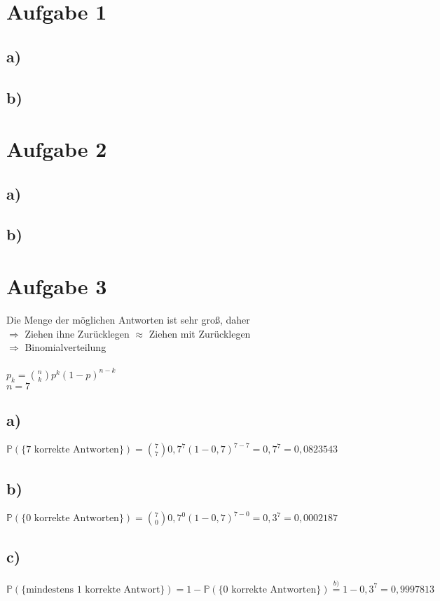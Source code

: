 \documentclass{scrartcl}
\begin{document}
\section*{Aufgabe 1}
  \subsection*{a)}

  \subsection*{b)}


\section*{Aufgabe 2}
  \subsection*{a)}

  \subsection*{b)}


\section*{Aufgabe 3}
	Die Menge der möglichen Antworten ist sehr groß, daher \\
	$\Rightarrow$ Ziehen ihne Zurücklegen $\approx$ Ziehen mit Zurücklegen \\
	$\Rightarrow$ Binomialverteilung \\
	\\
	$p_k = {n \choose k} p^k (1-p)^{n-k}$ \\
	$n = 7$
  \subsection*{a)}
	$\mathbb{P}(\{\text{7 korrekte Antworten}\}) = {7 \choose 7} 0,7^7 (1-0,7)^{7-7} = 0,7^7 = 0,0823543$
  \subsection*{b)}
	$\mathbb{P}(\{\text{0 korrekte Antworten}\}) = {7 \choose 0} 0,7^0 (1-0,7)^{7-0} = 0,3^7 = 0,0002187$
  \subsection*{c)}
	$\mathbb{P}(\{\text{mindestens 1 korrekte Antwort}\}) = 1 - \mathbb{P}(\{\text{0 korrekte Antworten}\}) \stackrel{b)}{=} 1 - 0,3^7 = 0,9997813$
\end{document}
